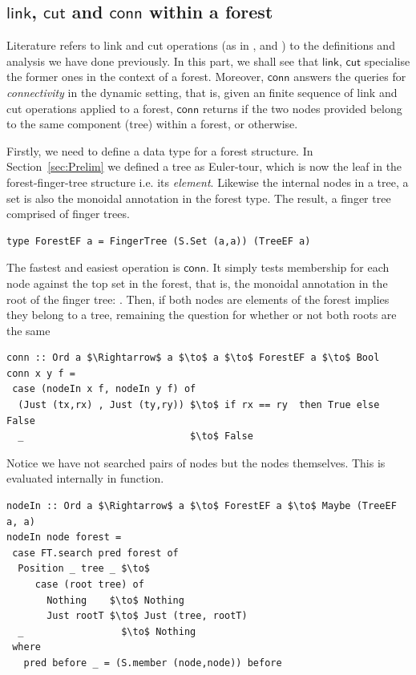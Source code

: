 \documentclass{elsarticle}
\newcommand{\code}[1]{\haskell{#1}}
\newcommand{\MATHSF}[1]{\ensuremath{\mathsf{#1}}\xspace}
\newcommand{\link}{\MATHSF{link}}
\newcommand{\cut}{\MATHSF{cut}}
\newcommand{\conn}{\MATHSF{conn}}
\begin{document}
\subsection{\link, \cut and \conn within a forest} 
Literature refers to link and cut operations (as in \cite{DS-DynTs}, \cite{WerneckR-PhD} and \cite{Rand-DynGs-Algos}) to the definitions and analysis we have done previously. In this part, we shall see that \link, \cut specialise the former ones in the context of a forest. Moreover, \conn answers the queries for \textit{connectivity} in the dynamic setting, that is, given an finite sequence of link and cut operations applied to a forest, \conn returns \code{True} if the two nodes provided belong to the same component (tree) within a forest, or \code{False} otherwise. 

Firstly, we need to define a data type for a forest structure. In Section~\ref{sec:Prelim} we defined a tree as Euler-tour, which is now the leaf in the forest-finger-tree structure i.e. its \textit{element}. Likewise the internal nodes in a tree, a set is also the monoidal annotation in the forest type. The result, a finger tree comprised of finger trees.
\begin{lstlisting}[mathescape] 
type ForestEF a = FingerTree (S.Set (a,a)) (TreeEF a) 
\end{lstlisting} 

The fastest and easiest operation is \conn. It simply tests membership for each node against the top set in the forest, that is, the monoidal annotation in the root of the finger tree: \code{nodeIn node forest}. Then, if both nodes are elements of the forest implies they belong to a tree, remaining the question for whether or not both roots are the same
\begin{lstlisting}[mathescape]
conn :: Ord a $\Rightarrow$ a $\to$ a $\to$ ForestEF a $\to$ Bool
conn x y f =
 case (nodeIn x f, nodeIn y f) of 
  (Just (tx,rx) , Just (ty,ry)) $\to$ if rx == ry  then True else False
  _                             $\to$ False
\end{lstlisting}

Notice we have not searched pairs of nodes but the nodes themselves. This is evaluated internally in \code{nodeIn} function.
\begin{lstlisting}[mathescape]
nodeIn :: Ord a $\Rightarrow$ a $\to$ ForestEF a $\to$ Maybe (TreeEF a, a) 
nodeIn node forest = 
 case FT.search pred forest of 
  Position _ tree _ $\to$
     case (root tree) of
       Nothing    $\to$ Nothing 
       Just rootT $\to$ Just (tree, rootT) 
  _                 $\to$ Nothing    
 where
   pred before _ = (S.member (node,node)) before 
\end{lstlisting} 
\end{document}
